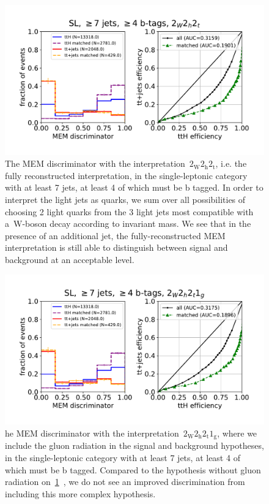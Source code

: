 \begin{figure}
\begin{centering}
\includegraphics[width = 1.0\textwidth]{figures/mem_sl_jge7_tge4.pdf}
\caption{The MEM discriminator with the interpretation~$2_{\mathrm{W}} 2_{\mathrm{h}} 2_{\mathrm{t}}$, i.e. the fully reconstructed interpretation, in the single-leptonic category with at least 7 jets, at least 4 of which must be b tagged. In order to interpret the light jets as quarks, we sum over all possibilities of choosing 2 light quarks from the 3 light jets most compatible with a~$\mathrm{W}$-boson decay according to invariant mass. We see that in the presence of an additional jet, the fully-reconstructed MEM interpretation is still able to distinguish between signal and background at an acceptable level.}
\label{fig:mem_sl_jge7_tge4}
\end{centering}
\end{figure}

\begin{figure}
\begin{centering}
\includegraphics[width = 1.0\textwidth]{figures/mem_sl_jge7_tge4_1g.pdf}
\caption{he MEM discriminator with the interpretation~$2_{\mathrm{W}} 2_{\mathrm{h}} 2_{\mathrm{t}} 1_{\mathrm{g}}$, where we include the gluon radiation in the signal and background hypotheses, in the single-leptonic category with at least 7 jets, at least 4 of which must be b tagged. Compared to the hypothesis without gluon radiation on~\cref{fig:mem_sl_jge7_tge4}~, we do not see an improved discrimination from including this more complex hypothesis.}
\label{fig:mem_sl_jge7_tge4_7jet}
\end{centering}
\end{figure}